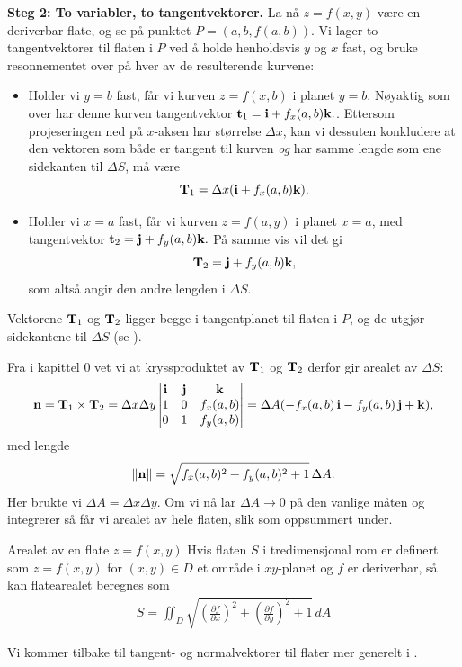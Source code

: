 \textbf{Steg 2: To variabler, to tangentvektorer.} La nå $z=f(x,y)$ være en deriverbar flate, og se på punktet $P=(a,b,f(a,b))$. Vi lager to tangentvektorer til flaten i $P$ ved å holde henholdsvis $y$ og $x$ fast, og bruke resonnementet over på hver av de resulterende kurvene:
\begin{itemize}
  \item Holder vi $y=b$ fast, får vi kurven $z=f(x,b)$ i planet $y=b$. Nøyaktig som over har denne kurven tangentvektor
  \(\mathbf{t}_1 = \mathbf{i} + f_x(a,b)\mathbf{k}.\). Ettersom projeseringen ned på $x$-aksen har størrelse $\Delta x$, kan vi dessuten konkludere at den vektoren som både er tangent til kurven \textit{og} har samme lengde som ene sidekanten til $\Delta S$, må være 
   \[\mathbf{T}_1 = \Delta x(\mathbf{i} + f_x(a,b)\mathbf{k}).\]

  \item Holder vi $x=a$ fast, får vi kurven $z=f(a,y)$ i planet $x=a$, med tangentvektor
  \(\mathbf{t}_2 = \mathbf{j} + f_y(a,b)\mathbf{k}.\) På samme vis vil det gi 
  \[\mathbf{T}_2 = \mathbf{j} + f_y(a,b)\mathbf{k},\]
  som altså angir den andre lengden i $\Delta S$.
\end{itemize}
Vektorene $\mathbf{T}_1$ og $\mathbf{T}_2$ ligger begge i tangentplanet til flaten i $P$, og de utgjør sidekantene til  $\Delta S$ (se ). 

Fra  i kapittel 0 vet vi at kryssproduktet av $\mathbf{T}_1$ og $\mathbf{T}_2$ derfor gir arealet av $\Delta S$:
\[
\mathbf{n} = \mathbf{T}_1 \times \mathbf{T}_2 =
\Delta x\Delta y\begin{vmatrix} \mathbf{i} & \mathbf{j} & \mathbf{k} \\ 1 & 0 & f_x(a,b) \\ 0 & 1 & f_y(a,b) \end{vmatrix}
= \Delta A(-f_x(a,b)\,\mathbf{i} - f_y(a,b)\,\mathbf{j} + \mathbf{k}),
\]
med lengde
\[
\lVert \mathbf{n} \rVert = \sqrt{f_x(a,b)^2+f_y(a,b)^2+1}\,\Delta A.
\]
Her brukte vi $\Delta A=\Delta x\Delta y$.
Om vi nå lar $\Delta A\to 0$ på den vanlige måten og integrerer så får vi arealet av hele flaten, slik som oppsummert under.



\begin{oppsum}{Arealet av en flate $z=f(x,y)$}
Hvis flaten $S$ i tredimensjonal rom er definert som $z=f(x,y)$ for $(x,y) \in D$ et område i $xy$-planet og $f$ er deriverbar, så kan flatearealet beregnes som 
\begin{align} \label{anv:flateareal}
S = \iint_D \sqrt{\left( \frac{\partial f}{\partial x} \right)^2 + \left( \frac{\partial f}{\partial y} \right)^2 + 1}\, dA
\end{align}
\end{oppsum}
Vi kommer tilbake til tangent- og normalvektorer til flater mer generelt i .

